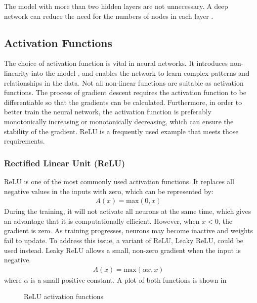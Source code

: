 The model with more than two hidden layers are not unnecessary. 
A deep network can reduce the need for the numbers of nodes in each layer \cite{Poggio2016WhyAW}. 

\subsection{Activation Functions} \label{Section:activation}

The choice of activation function is vital in neural networks. 
It introduces non-linearity into the model \cite{activation}, and enables the network to learn complex patterns and relationships in the data. 
Not all non-linear functions are suitable as activation functions. The process of gradient descent requires the activation function to be differentiable so that the gradients can be calculated. 
Furthermore, in order to better train the neural network, the activation function is preferably monotonically increasing or monotonically decreasing, which can ensure the stability of the gradient.
ReLU is a frequently used example that meets those requirements. 

\subsubsection{Rectified Linear Unit (ReLU)}

ReLU is one of the most commonly used activation functions. It replaces all negative values in the inputs with zero, which can be represented by: 
\begin{gather}
    A(x) = \mathrm{max}(0, x) 
\end{gather}
During the training, it will not activate all neurons at the same time, which gives an advantage that it is computationally efficient.
However, when $x < 0$, the gradient is zero. As training progresses, neurons may become inactive and weights fail to update.
To address this issue, a variant of ReLU, Leaky ReLU, could be used instead. Leaky ReLU allows a small, non-zero gradient when the input is negative.
\begin{gather}
    A(x) = \mathrm{max}(\alpha x, x) 
\end{gather}
where $\alpha$ is a small positive constant. A plot of both functions is shown in 

\begin{figure}[!htb]
    \centering
    \caption{ReLU activation functions}
    \label{Figure:ReLUplots}
\end{figure}

